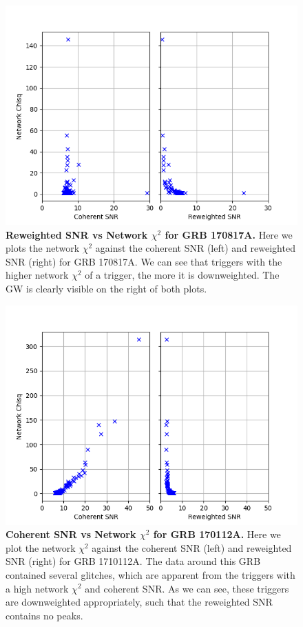 \documentclass[11pt]{cuthesis}
\begin{document}
\begin{figure} %
\begin{center}
\includegraphics[width=0.8\linewidth]{network_snrs_vs_chisqN_170817.png}
\end{center}
\caption{\textbf{Reweighted SNR vs Network $\chi^2$ for GRB 170817A.} Here we plots the network $\chi^2$ against the coherent SNR (left) and reweighted SNR (right) for GRB 170817A. We can see that triggers with the higher network $\chi^2$ of a trigger, the more it is downweighted. The GW is clearly visible on the right of both plots. } 
\label{fig:snrs vs chisq 170817}
\end{figure}

\begin{figure} %
\begin{center}
\includegraphics[width=0.8\linewidth]{network_snrs_vs_chisqN_GRB170112A.png}
\end{center}
\caption{\textbf{Coherent SNR vs Network $\chi^2$ for GRB 170112A.} Here we plot the network $\chi^2$ against the coherent SNR (left) and reweighted SNR (right) for GRB 1710112A. The data around this GRB contained several glitches, which are apparent from the triggers with a high network $\chi^2$ and coherent SNR. As we can see, these triggers are downweighted appropriately, such that the reweighted SNR contains no peaks.  } 
\label{fig:snrs vs chisq GRB170112A}
\end{figure}
\end{document}
